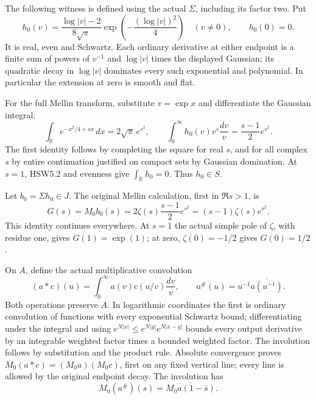 The following witness is defined using the actual \(\Sigma\), including
its factor two. Put \[
h_0(v)=
\frac{\log|v|-2}{8\sqrt\pi}
\exp\!\left(-\frac{(\log|v|)^2}{4}\right)\quad(v\ne0),
\qquad h_0(0)=0.
\tag{HSW5.1}
\] It is real, even and Schwartz. Each ordinary derivative at either
endpoint is a finite sum of powers of \(v^{-1}\) and \(\log|v|\) times
the displayed Gaussian; its quadratic decay in \(\log|v|\) dominates
every such exponential and polynomial. In particular the extension at
zero is smooth and flat.

For the full Mellin transform, substitute \(v=\exp x\) and differentiate
the Gaussian integral: \[
\int_{\mathbb R}e^{-x^2/4+sx}\,dx=2\sqrt\pi\,e^{s^2},\qquad
\int_0^\infty h_0(v)v^s\frac{dv}{v}
=\frac{s-1}{2}e^{s^2}.
\tag{HSW5.2}
\] The first identity follows by completing the square for real \(s\),
and for all complex \(s\) by entire continuation justified on compact
sets by Gaussian domination. At \(s=1\), HSW5.2 and evenness give
\(\int_{\mathbb{R}} h_0=0\). Thus \(h_0\in S\).

Let \(b_0=\Sigma h_0\in J\). The original Mellin calculation, first in
\(\Re s>1\), is \[
G(s)=M_0b_0(s)
=2\zeta(s)\frac{s-1}{2}e^{s^2}
=(s-1)\zeta(s)e^{s^2}.
\tag{HSW5.3}
\] This identity continues everywhere. At \(s=1\) the actual simple pole
of \(\zeta\), with residue one, gives \(G(1)=\exp(1)\); at zero,
\(\zeta(0)=-1/2\) gives \(G(0)=1/2\).

On \(A\), define the actual multiplicative convolution \[
(a*c)(u)=\int_0^\infty a(v)c(u/v)\frac{dv}{v},\qquad
a^\#(u)=u^{-1}\overline{a(u^{-1})}.
\] Both operations preserve \(A\). In logarithmic coordinates the first
is ordinary convolution of functions with every exponential Schwartz
bound; differentiating under the integral and using
\(e^{N|x|}\le e^{N|y|}e^{N|x-y|}\) bounds every output derivative by an
integrable weighted factor times a bounded weighted factor. The
involution follows by substitution and the product rule. Absolute
convergence proves \(M_0(a*c)=(M_0a)(M_0c)\), first on any fixed
vertical line; every line is allowed by the original endpoint decay. The
involution has \[
M_0(a^\#)(s)=\overline{M_0a(1-\bar s)}.
\tag{HSW5.4}
\]

